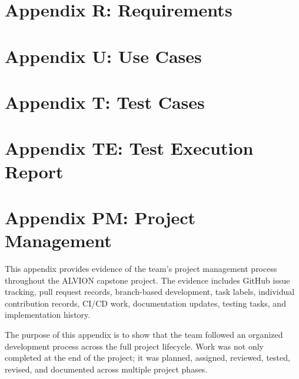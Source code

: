\documentclass[11pt]{report}
\begin{document}
\section*{Appendix R: Requirements}


\section*{Appendix U: Use Cases}


\section*{Appendix T: Test Cases}


\section*{Appendix TE: Test Execution Report}


\clearpage
\section*{Appendix PM: Project Management}

This appendix provides evidence of the team's project management process throughout the ALVION capstone project. The evidence includes GitHub issue tracking, pull request records, branch-based development, task labels, individual contribution records, CI/CD work, documentation updates, testing tasks, and implementation history.

The purpose of this appendix is to show that the team followed an organized development process across the full project lifecycle. Work was not only completed at the end of the project; it was planned, assigned, reviewed, tested, revised, and documented across multiple project phases.
\end{document}
